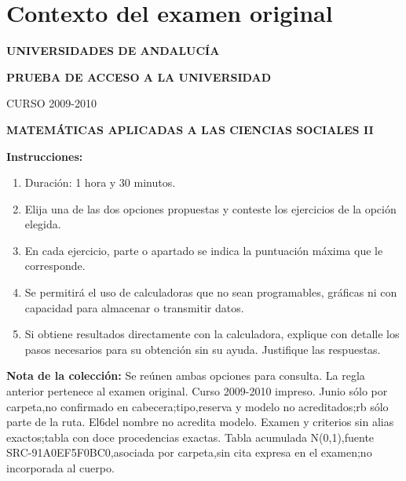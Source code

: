 \section*{Contexto del examen original}
\textbf{UNIVERSIDADES DE ANDALUCÍA}\par
\textbf{PRUEBA DE ACCESO A LA UNIVERSIDAD}\par
CURSO 2009-2010\par
\textbf{MATEMÁTICAS APLICADAS A LAS CIENCIAS SOCIALES II}

\textbf{Instrucciones:}
\begin{enumerate}[label=\textbf{\alph*)}]
  \item Duración: 1 hora y 30 minutos.
  \item Elija una de las dos opciones propuestas y conteste los ejercicios de la opción elegida.
  \item En cada ejercicio, parte o apartado se indica la puntuación máxima que le corresponde.
  \item Se permitirá el uso de calculadoras que no sean programables, gráficas ni con capacidad para almacenar o transmitir datos.
  \item Si obtiene resultados directamente con la calculadora, explique con detalle los pasos necesarios para su obtención sin su ayuda. Justifique las respuestas.
\end{enumerate}
\noindent\textbf{Nota de la colección:} Se reúnen ambas opciones para consulta. La regla anterior pertenece al examen original. Curso 2009-2010 impreso. Junio sólo por carpeta,no confirmado en cabecera;tipo,reserva y modelo no acreditados;rb sólo parte de la ruta. El6del nombre no acredita modelo. Examen y criterios sin alias exactos;tabla con doce procedencias exactas. Tabla acumulada N(0,1),fuente SRC-91A0EF5F0BC0,asociada por carpeta,sin cita expresa en el examen;no incorporada al cuerpo.
\par\medskip
